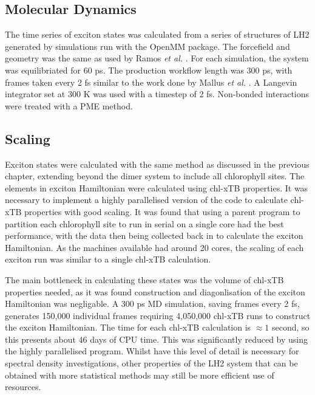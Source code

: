 \subsection{Molecular Dynamics}
\label{subsec:specdens_MD}

The time series of exciton states was calculated from a series of structures of 
LH2 generated by simulations run with the OpenMM package. The forcefield and geometry
was the same as used by Ramos \emph{et al.} \cite{Mennucci2019}. For each simulation,
the system was equilibriated for 60 ps. The production workflow length was 300 ps, 
with frames taken every 2 fs similar to the work done by Mallus \emph{et al.} \cite{Mallus2018}.
A Langevin integrator set at 300 K was used with a timestep of 2 fs. Non-bonded
interactions were treated with a PME method.

\subsection{Scaling}
\label{subsec:specdens_scaling}

Exciton states were calculated with the same method as discussed in the previous 
chapter, extending beyond the dimer system to include all chlorophyll sites. The
elements in exciton Hamiltonian were calculated using chl-xTB properties. It was
necessary to implement a highly parallelised version of the code to calculate chl-xTB
properties with good scaling. It was found that using a parent program to partition
each chlorophyll site to run in serial on a single core had the best performance,
with the data then being collected back in to calculate the exciton Hamiltonian.
As the machines available had around 20 cores, the scaling of each exciton run was
similar to a single chl-xTB calculation.

The main bottleneck in calculating these states was the volume of chl-xTB properties
needed, as it was found construction and diagonlisation of the exciton Hamiltonian
was negligable. A 300 ps MD simulation, saving frames every 2 fs, generates 150,000
individual frames requiring 4,050,000 chl-xTB runs to construct the exciton Hamiltonian.
The time for each chl-xTB calculation is $\approx 1$ second, so this presents about
46 days of CPU time. This was significantly reduced by using the highly parallelised
program. Whilst have this level of detail is necessary for spectral density investigations,
other properties of the LH2 system that can be obtained with more statistical methods
may still be more efficient use of resources.

